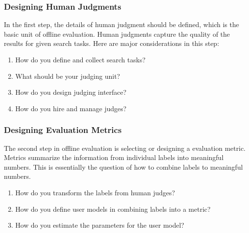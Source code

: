 \subsubsection{Designing Human Judgments}

In the first step, the details of human judgment should be defined, which is the basic unit of offline evaluation. Human judgments capture the quality of the results for given search tasks. Here are major considerations in this step:

\begin{enumerate}
	\item How do you define and collect search tasks?
	\item What should be your judging unit?
	\item How do you design judging interface?
	\item How do you hire and manage judges?%
\end{enumerate}

\subsubsection{Designing Evaluation Metrics}

The second step in offline evaluation is selecting or designing a  evaluation metric. Metrics summarize the information from individual labels into meaningful numbers. This is essentially the question of how to combine labels to meaningful numbers.

\begin{enumerate}
	\item How do you transform the labels from human judges?
	\item How do you define user models in combining labels into a metric? 
	\item How do you estimate the parameters for the user model?
\end{enumerate}

